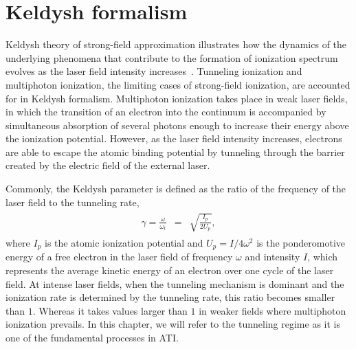 

\section{\label{sec:keldysh} Keldysh formalism}




Keldysh theory of strong-field approximation illustrates how the
dynamics of the underlying phenomena that contribute to the formation
of ionization spectrum evolves as the laser field intensity
increases~\cite{KeldyshSFA}. Tunneling ionization and multiphoton
ionization, the limiting cases of strong-field ionization, are
accounted for in Keldysh formalism. Multiphoton ionization takes place
in weak laser fields, in which the transition of an electron into the
continuum is accompanied by simultaneous absorption of several photons
enough to increase their energy above the ionization
potential. However, as the laser field intensity increases, electrons
are able to escape the atomic binding potential by tunneling through
the barrier created by the electric field of the external laser.


Commonly, the Keldysh parameter is defined as the ratio of the
frequency of the laser field to the tunneling rate,
%
\begin{eqnarray}
\begin{split}
\gamma = \frac{\omega}{\omega_{t}} & = & \sqrt{\frac{I_{p}}{2 U_{p}}},
\end{split}
\end{eqnarray}
%
where $I_{p}$ is the atomic ionization potential and $U_{p} = I /
4\omega^{2}$ is the ponderomotive energy of a free electron in the
laser field of frequency $\omega$ and intensity $I$, which represents
the average kinetic energy of an electron over one cycle of the laser
field. At intense laser fields, when the tunneling mechanism is
dominant and the ionization rate is determined by the tunneling rate,
this ratio becomes smaller than $1$. Whereas it takes values larger
than $1$ in weaker fields where multiphoton ionization prevails. In
this chapter, we will refer to the tunneling regime as it is one of
the fundamental processes in ATI.

